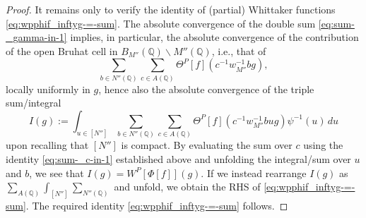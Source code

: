 \begin{proof}
  It remains only to verify the identity of (partial) Whittaker functions \eqref{eq:wpphif_inftyg-=-sum}.  The absolute convergence of the double sum \eqref{eq:sum-_gamma-in-1} implies, in particular, the absolute convergence of the contribution of the open Bruhat cell in ${B}_{M''}(\mathbb{Q}) \backslash M''(\mathbb{Q})$, i.e., that of
  \begin{equation*}
    \sum_{b \in N''(\mathbb{Q})}
    \sum_{c \in A(\mathbb{Q})}
    \Theta^P[f]
    (
    c^{-1} w_{M''}^{-1} b g
    ),
  \end{equation*}
  locally uniformly in $g$, hence also the absolute convergence of the triple sum/integral
  \begin{equation*}
    I(g)
    :=
    \int_{u \in [N'']}
    \sum_{b \in N''(\mathbb{Q})}
    \sum_{c \in A(\mathbb{Q})}
    \Theta^P[f]
    (
    c^{-1} w_{M''}^{-1} b u g
    ) \psi^{-1}(u) \, d u
  \end{equation*}
  upon recalling that $[N'']$ is compact.  By evaluating the sum over $c$ using the identity \eqref{eq:sum-_c-in-1} established above and unfolding the integral/sum over $u$ and $b$, we see that $I(g) = W^P[\Phi[f]](g)$.  If we instead rearrange $I(g)$ as $\sum_{A(\mathbb{Q}) } \int_{[N'']} \sum_{N''(\mathbb{Q})}$ and unfold, we obtain the RHS of \eqref{eq:wpphif_inftyg-=-sum}.  The required identity \eqref{eq:wpphif_inftyg-=-sum} follows.
\end{proof}

